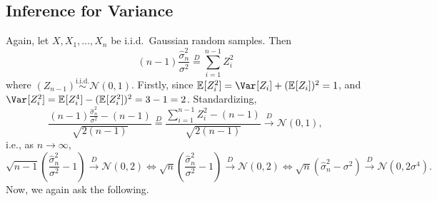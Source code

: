\subsection{Inference for Variance}
Again, let \(X, X_1, \dots , X_n\) be i.i.d.\ Gaussian random samples. Then
\[
	(n-1) \frac{\hat{\sigma} _n^2}{\sigma ^2}
	\overset{D}{=} \sum_{i=1}^{n-1} Z_i^2
\]
where \((Z_{n-1}) \overset{\text{i.i.d.} }{\sim } \mathcal{N} (0, 1)\). Firstly, since \(\mathbb{E}_{}[Z_i^2] = \Var_{}[Z_i] + (\mathbb{E}_{}[Z_i] )^2 = 1\), and \(\Var_{}[Z_i^2] = \mathbb{E}_{}[Z_i^4] - (\mathbb{E}_{}[Z_i^2] )^2 = 3 - 1 = 2\). Standardizing,
\[
	\frac{(n-1) \frac{\hat{\sigma} _n^2}{\sigma ^2} - (n - 1)}{\sqrt{2 (n-1)} }
	\overset{D}{=} \frac{\sum_{i=1}^{n-1} Z_i^2 - (n-1)}{\sqrt{2 (n-1)} }
	\overset{D}{\to } \mathcal{N} (0, 1),
\]
i.e., as \(n \to \infty \),
\[
	\sqrt{n-1} \left( \frac{\hat{\sigma} _n^2}{\sigma ^2} - 1 \right)  \overset{D}{\to } \mathcal{N} (0, 2)
	\iff \sqrt{n} \left( \frac{\hat{\sigma} _n^2}{\sigma ^2} - 1 \right)  \overset{D}{\to } \mathcal{N} (0, 2)
	\iff \sqrt{n} (\hat{\sigma} _n^2 - \sigma ^2) \overset{D}{\to } \mathcal{N} (0, 2 \sigma ^4).
\]
Now, we again ask the following.

